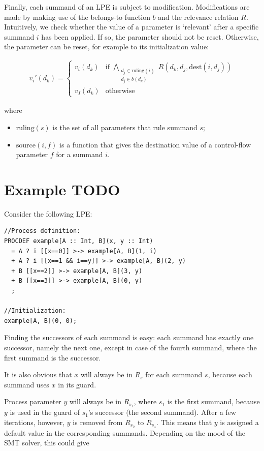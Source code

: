 Finally, each summand of an LPE is subject to modification.
Modifications are made by making use of the belongs-to function $b$ and the relevance relation $R$.
Intuitively, we check whether the value of a parameter is `relevant' after a specific summand $i$ has been applied.
If so, the parameter should not be reset.
Otherwise, the parameter can be reset, for example to its initialization value:

\begin{align*}
v_{i}{'}(d_k) = \begin{cases}
v_{i}(d_k) & \text{if } \bigwedge\limits_{\substack{d_j \in \text{ruling}(i) \\ d_j \in b(d_k)}}^{} R(d_k, d_j, \text{dest}(i, d_j)) \\
v_{I}(d_k) & \text{otherwise}
\end{cases}
\end{align*}

where

\begin{itemize}
\item $\text{ruling}(s)$ is the set of all parameters that rule summand $s$;
\item $\text{source}(i, f)$ is a function that gives the destination value of a control-flow parameter $f$ for a summand $i$.
\end{itemize}

\section{Example TODO}

Consider the following LPE:

\begin{lstlisting}
//Process definition:
PROCDEF example[A :: Int, B](x, y :: Int)
  = A ? i [[x==0]] >-> example[A, B](1, i)
  + A ? i [[x==1 && i==y]] >-> example[A, B](2, y)
  + B [[x==2]] >-> example[A, B](3, y)
  + B [[x==3]] >-> example[A, B](0, y)
  ;

//Initialization:
example[A, B](0, 0);
\end{lstlisting}

Finding the successors of each summand is easy: each summand has exactly one successor, namely the next one, except in case of the fourth summand, where the first summand is the successor.

It is also obvious that $x$ will always be in $R_s$ for each summand $s$, because each summand uses $x$ in its guard.

Process parameter $y$ will always be in $R_{s_1}$, where $s_1$ is the first summand, because $y$ is used in the guard of $s_1$'s successor (the second summand).
After a few iterations, however, $y$ is removed from $R_{s_2}$ to $R_{s_4}$.
This means that $y$ is assigned a default value in the corresponding summands.
Depending on the mood of the SMT solver, this could give

